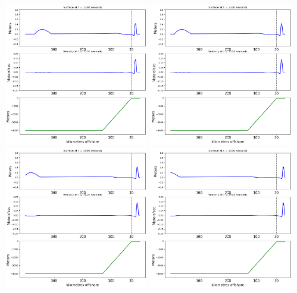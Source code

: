 \documentclass[11pt]{article}
\begin{document}
\vskip 10pt 
\includegraphics[width=0.475\textwidth]{frame0012fig2.png}
\vskip 10pt 
\includegraphics[width=0.475\textwidth]{frame0013fig2.png}
\vskip 10pt 
\includegraphics[width=0.475\textwidth]{frame0014fig2.png}
\vskip 10pt 
\includegraphics[width=0.475\textwidth]{frame0015fig2.png}
\end{document}
